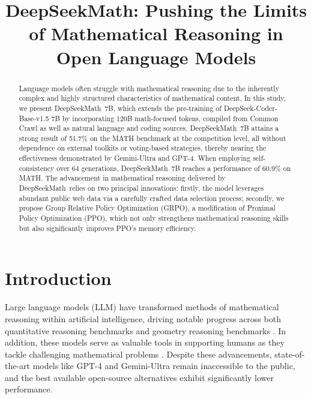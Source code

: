 \title{DeepSeekMath: Pushing the Limits of Mathematical Reasoning in Open Language Models}

\begin{abstract}
Language models often struggle with mathematical reasoning due to the inherently complex and highly structured characteristics of mathematical content. In this study, we present DeepSeekMath~7B, which extends the pre-training of DeepSeek-Coder-Base-v1.5 7B by incorporating 120B math-focused tokens, compiled from Common Crawl as well as natural language and coding sources. DeepSeekMath~7B attains a strong result of 51.7\% on the MATH benchmark at the competition level, all without dependence on external toolkits or voting-based strategies, thereby nearing the effectiveness demonstrated by Gemini-Ultra and GPT-4. When employing self-consistency over 64 generations, DeepSeekMath~7B reaches a performance of 60.9\% on MATH. The advancement in mathematical reasoning delivered by DeepSeekMath~relies on two principal innovations: firstly, the model leverages abundant public web data via a carefully crafted data selection process; secondly, we propose Group Relative Policy Optimization (GRPO), a modification of Proximal Policy Optimization (PPO), which not only strengthens mathematical reasoning skills but also significantly improves PPO’s memory efficiency.
\end{abstract}

\section{Introduction}

Large language models (LLM) have transformed methods of mathematical reasoning within artificial intelligence, driving notable progress across both quantitative reasoning benchmarks \citep{MATH} and geometry reasoning benchmarks \citep{trinh2024solving}. In addition, these models serve as valuable tools in supporting humans as they tackle challenging mathematical problems \citep{tao}. Despite these advancements, state-of-the-art models like GPT-4 \citep{gpt4} and Gemini-Ultra \citep{gemini} remain inaccessible to the public, and the best available open-source alternatives exhibit significantly lower performance.

